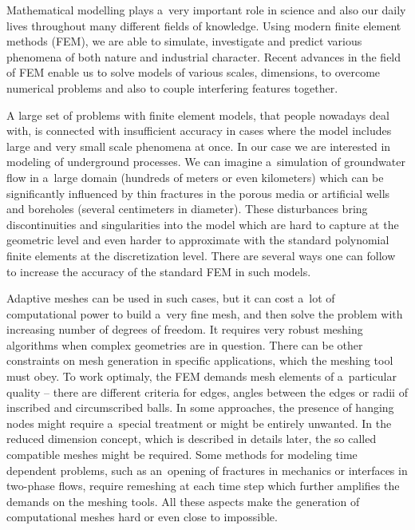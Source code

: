 Mathematical modelling plays a~very important role in science and also our daily lives throughout many different
fields of knowledge. Using modern finite element methods (FEM), we are able to simulate, investigate and predict
various phenomena of both nature and industrial character. Recent advances in the field of FEM
enable us to solve models of various scales, dimensions, to overcome numerical problems and also 
to couple interfering features together.

A large set of problems with finite element models, that people nowadays deal with, is connected with 
insufficient accuracy in cases where the model includes large and very small scale phenomena at once.
In our case we are interested in modeling of underground processes.
We can imagine a~simulation of groundwater flow in a~large domain (hundreds of meters or even kilometers) which can be significantly
influenced by thin fractures in the porous media or artificial wells and boreholes (several centimeters in diameter).
These disturbances bring discontinuities and singularities into the model which are hard to capture at the geometric level
and even harder to approximate with the standard polynomial finite elements at the discretization level.
There are several ways one can follow to increase the accuracy of the standard FEM in such models. 

Adaptive meshes can be used in such cases, but it can cost a~lot of computational power to build a~very fine mesh,
and then solve the problem with increasing number of degrees of freedom.
It requires very robust meshing algorithms when complex geometries are in question.
There can be other constraints on mesh generation in specific applications, which the meshing tool must obey.
To work optimaly, the FEM demands mesh elements of a~particular quality -- there are different criteria
for edges, angles between the edges or radii of inscribed and circumscribed balls.
In some approaches, the presence of hanging nodes might require a~special treatment or might be entirely unwanted.
In the reduced dimension concept, which is described in details later, the so called compatible meshes might be required.
Some methods for modeling time dependent problems, such as an~opening of fractures in mechanics or interfaces in two-phase flows,
require remeshing at each time step which further amplifies the demands on the meshing tools.
All these aspects make the generation of computational meshes hard or even close to impossible.

